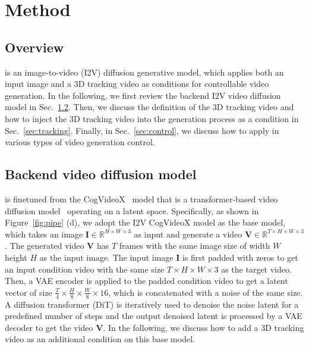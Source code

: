 \section{Method}

\subsection{Overview}
\methodname is an image-to-video (I2V) diffusion generative model, which applies both an input image and a 3D tracking video as conditions for controllable video generation. In the following, we first review the backend I2V video diffusion model in Sec.~\ref{sec:dit}. Then, we discuss the definition of the 3D tracking video and how to inject the 3D tracking video into the generation process as a condition in Sec.~\ref{sec:tracking}. Finally, in Sec.~\ref{sec:control}, we discuss how to apply \methodname in various types of video generation control.

\subsection{Backend video diffusion model}
\label{sec:dit}

\methodname is finetuned from the CogVideoX~\cite{yang2024cogvideox} model that is a transformer-based video diffusion model~\cite{peebles2023scalable} operating on a latent space. 
Specifically, as shown in Figure~\ref{fig:pipe} (d), we adopt the I2V CogVideoX model as the base model, which takes an image $\mathbf{I}\in \mathbb{R}^{H\times W \times 3}$ as input and generate a video $\mathbf{V} \in \mathbb{R}^{T\times H\times W\times 3}$. The generated video $\mathbf{V}$ has $T$ frames with the same image size of width $W$ height $H$ as the input image. The input image $\mathbf{I}$ is first padded with zeros to get an input condition video with the same size $T\times H\times W \times 3$ as the target video. Then, a VAE encoder is applied to the padded condition video to get a latent vector of size $\frac{T}{4}\times \frac{H}{8}\times \frac{W}{8}\times 16$, which is concatenated with a noise of the same size. A diffusion transformer (DiT) \cite{peebles2023scalablediffusionmodelstransformers} is iteratively used to denoise the noise latent for a predefined number of steps and the output denoised latent is processed by a VAE decoder to get the video $\mathbf{V}$. In the following, we discuss how to add a 3D tracking video as an additional condition on this base model.

